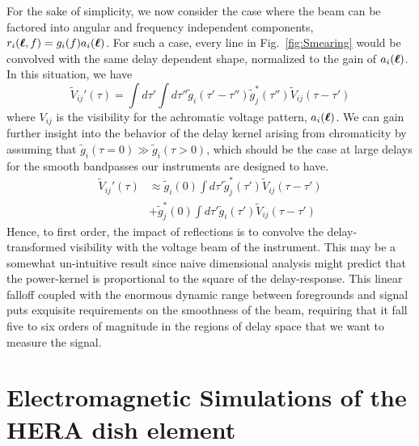 \documentclass[twocolumn]{emulateapj}
\begin{document}
For the sake of simplicity, we now consider the case where the beam can be factored into angular and frequency independent components, $r_i(\boldsymbol{\ell},f) = g_i(f)a_i(\boldsymbol{\ell})$. For such a case, every line in Fig.~\ref{fig:Smearing} would be convolved with the same delay dependent shape, normalized to the gain of $a_i(\boldsymbol{\ell})$. In this situation, we have
\begin{equation}
\widetilde{V}_{ij}'(\tau) = \int d\tau' \int d \tau'' \widetilde{g}_i(\tau' - \tau'')\widetilde{g}^*_j(\tau'') \widetilde{V}_{ij}(\tau-\tau')
\end{equation}
where $V_{ij}$ is the visibility for the achromatic voltage pattern, $a_i(\boldsymbol{\ell})$. 
We can gain further insight into the behavior of the delay kernel arising from chromaticity by assuming that $\widetilde{g}_i(\tau=0)\gg\widetilde{g}_i(\tau>0)$, which should be the case at large delays for the smooth bandpasses our instruments are designed to have. 
\begin{align}\label{eq:KernelApprox}
\widetilde{V}_{ij}'(\tau) &\approx \widetilde{g}_i(0)\int d \tau' \widetilde{g}_j^*(\tau')\widetilde{V}_{ij}(\tau- \tau') \nonumber \\
& + \widetilde{g}_j^*(0) \int d \tau' \widetilde{g}_i(\tau')\widetilde{V}_{ij}(\tau-\tau') 
\end{align}
Hence, to first order, the impact of reflections is to convolve the delay-transformed visibility with the voltage beam of the instrument. This may be a somewhat un-intuitive result since naive dimensional analysis might predict that the power-kernel is proportional to the square of the delay-response. This linear falloff coupled with the enormous dynamic range between foregrounds and signal puts exquisite requirements on the smoothness of the beam, requiring that it fall five to six orders of magnitude in the regions of delay space that we want to measure the signal.


\section{Electromagnetic Simulations of the HERA dish element}\label{sec:Simulations}
\end{document}

